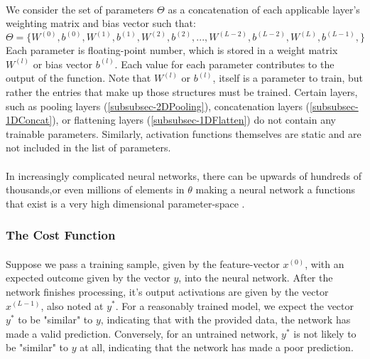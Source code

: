 \documentclass[12pt,letterpaper]{article}
\begin{document}
\paragraph*{}We consider the set of parameters $\Theta$ as a concatenation of each applicable layer's weighting matrix and bias vector such that:
\begin{equation}
\label{eqn-Theta}
\Theta = \big\{
W^{(0)}, b^{(0)}, W^{(1)}, b^{(1)}, W^{(2)}, b^{(2)}, ... ,W^{(L-2)}, b^{(L-2)}, W^{(L)}, b^{(L-1)},
\big\}
\end{equation}
Each parameter is floating-point number, which is stored in a weight matrix $W^{(l)}$ or bias vector $b^{(l)}$. Each value for each parameter contributes to the output of the function. Note that $W^{(l)}$ or $b^{(l)}$, itself is a parameter to train, but rather the entries that make up those structures must be trained. Certain layers, such as pooling layers (\ref{subsubsec-2DPooling}), concatenation layers (\ref{subsubsec-1DConcat}), or flattening layers (\ref{subsubsec-1DFlatten}) do not contain any trainable parameters. Similarly, activation functions themselves are static and are not included in the list of parameters.

\paragraph*{}In increasingly complicated neural networks, there can be upwards of hundreds of thousands,or even millions of elements in $\theta$ making a neural network a functions that exist is a very high dimensional parameter-space \cite{Geron,Goodfellow,Levine}.

\subsubsection{The Cost Function}

\paragraph*{}Suppose we pass a training sample, given by the feature-vector $x^{(0)}$, with an expected outcome given by the vector $y$, into the neural network. After the network finishes processing, it's output activations are given by the vector $x^{(L-1)}$, also noted at $y^*$. For a reasonably trained model, we expect the vector $y^*$ to be "similar" to $y$, indicating that with the provided data, the network has made a valid prediction. Conversely, for an untrained network, $y^*$ is not likely to be "similar" to $y$ at all, indicating that the network has made a poor prediction. 
\end{document}
